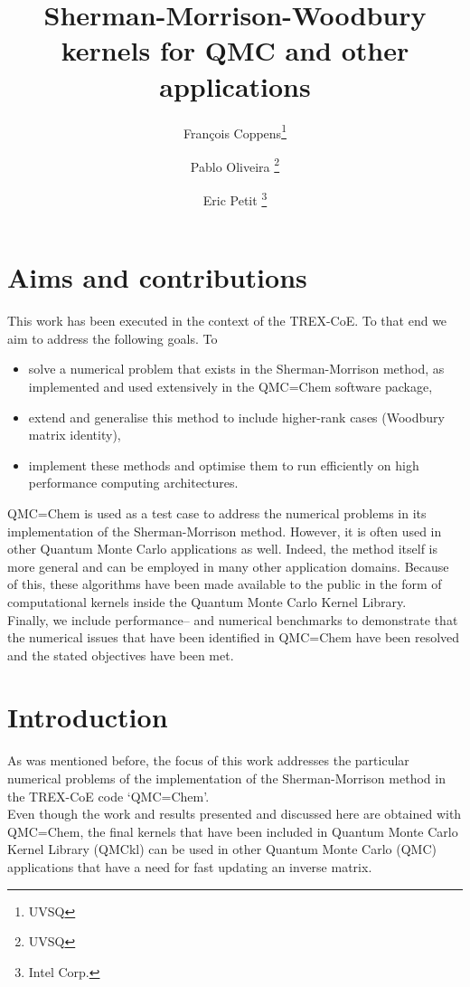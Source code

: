\documentclass[11pt]{article}
\title{Sherman-Morrison-Woodbury kernels for QMC and other applications}
\author{Fran\c{c}ois Coppens\thanks{UVSQ} \and Pablo Oliveira \thanks{UVSQ} \and Eric Petit \thanks{Intel Corp.}}
\numberwithin{figure}{section}
\numberwithin{table}{section}
\begin{document}
  \maketitle
  \tableofcontents

  \newpage
  \section{Aims and contributions}      
    This work has been executed in the context of the TREX-CoE\cite{trex-coe}. To that end we aim to address the following goals. To
    \begin{itemize}
      \item solve a numerical problem that exists in the Sherman-Morrison method, as implemented and used extensively in the QMC=Chem\cite{qmc-chem} software package,
      \item extend and generalise this method to include higher-rank cases (Woodbury matrix identity),
      \item implement these methods and optimise them to run efficiently on high performance computing architectures.
    \end{itemize}
      
      QMC=Chem is used as a test case to address the numerical problems in its implementation of the Sherman-Morrison method. However, it is often used in other Quantum Monte Carlo applications as well. Indeed, the method itself is more general and can be employed in many other application domains. Because of this, these algorithms have been made available to the public in the form of computational kernels inside the Quantum Monte Carlo Kernel Library\cite{qmckl}.\\
      
      Finally, we include performance-- and numerical benchmarks to demonstrate that the numerical issues that have been identified in QMC=Chem have been resolved and the stated objectives have been met.

  \section{Introduction}
	
      As was mentioned before, the focus of this work addresses the particular numerical problems of the implementation of the Sherman-Morrison method in the TREX-CoE code `QMC=Chem'.\\
      
      Even though the work and results presented and discussed here are obtained with QMC=Chem, the final kernels that have been included in Quantum Monte Carlo Kernel Library (QMCkl) can be used in other Quantum Monte Carlo (QMC) applications that have a need for fast updating an inverse matrix.\\
      
\end{document}
